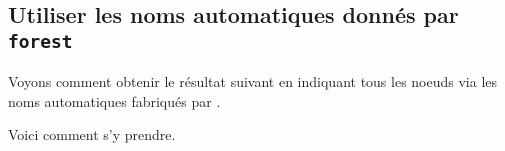 \documentclass[12pt,a4paper]{article}
\begin{document}

\subsection{Utiliser les noms automatiques donnés par \texttt{forest}} \label{tnsproba-autonum-forest}

Voyons comment obtenir le résultat suivant en indiquant tous les noeuds via les noms automatiques fabriqués par \verb@forest@.


%
%
%



Voici comment s'y prendre.
\end{document}
